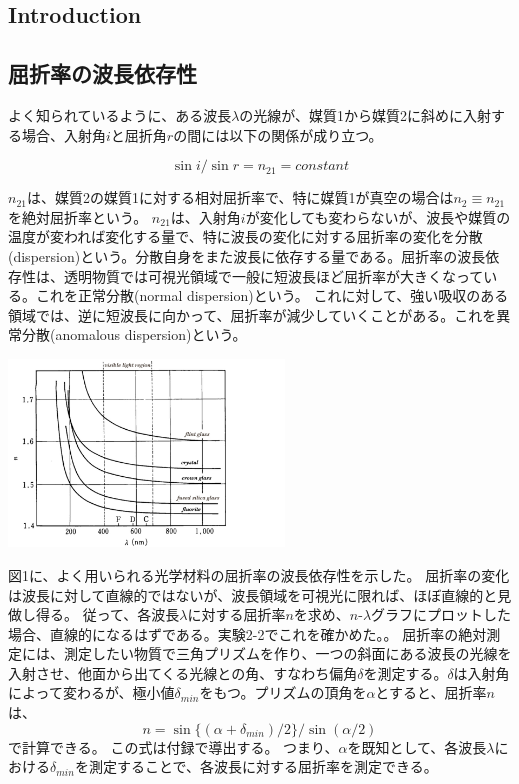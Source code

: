 \documentclass[a4paper,10pt]{jsarticle}
\makeatletter
\newenvironment{figurehere}
{\def\@captype{figure}}
{}
\makeatother
\begin{document}
\begin{multicols}{2}
\section{Introduction}
\subsection{屈折率の波長依存性}
よく知られているように、ある波長$\lambda$の光線が、媒質1から媒質2に斜めに入射する場合、入射角$i$と屈折角$r$の間には以下の関係が成り立つ。

\begin{equation}
  \sin{i}/\sin{r} = n_{21} = constant
\end{equation}

$n_{21}$は、媒質2の媒質1に対する相対屈折率で、特に媒質1が真空の場合は$n_{2}\equiv n_{21}$を絶対屈折率という。
$n_{21}$は、入射角$i$が変化しても変わらないが、波長や媒質の温度が変われば変化する量で、特に波長の変化に対する屈折率の変化を分散(dispersion)という。分散自身をまた波長に依存する量である。屈折率の波長依存性は、透明物質では可視光領域で一般に短波長ほど屈折率が大きくなっている。これを正常分散(normal dispersion)という。
これに対して、強い吸収のある領域では、逆に短波長に向かって、屈折率が減少していくことがある。これを異常分散(anomalous dispersion)という。

\begin{figurehere}
\centering
\includegraphics[width=0.55\textwidth]{figs/kusseturitu.pdf}
\caption[]{%
光学材料の屈折率の波長依存性
\footnotemark}
\end{figurehere}

図1に、よく用いられる光学材料の屈折率の波長依存性を示した。
屈折率の変化は波長に対して直線的ではないが、波長領域を可視光に限れば、ほぼ直線的と見做し得る。
従って、各波長$\lambda$に対する屈折率$n$を求め、$n$-$\lambda$グラフにプロットした場合、直線的になるはずである。実験2-2でこれを確かめた。。
屈折率の絶対測定には、測定したい物質で三角プリズムを作り、一つの斜面にある波長の光線を入射させ、他面から出てくる光線との角、すなわち偏角$\delta$を測定する。$\delta$は入射角によって変わるが、極小値$\delta_{min}$をもつ。プリズムの頂角を$\alpha$とすると、屈折率$n$は、
\begin{equation}
  n =\sin\{(\alpha+\delta_{min})/2\}/\sin(\alpha/2)
\end{equation}
で計算できる。
この式は付録で導出する。
つまり、$\alpha$を既知として、各波長$\lambda$における$\delta_{min}$を測定することで、各波長に対する屈折率を測定できる。

\end{multicols}
\end{document}
